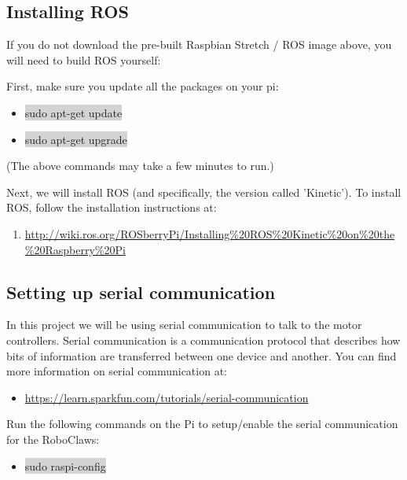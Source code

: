 \documentclass{article}
\begin{document}
\subsection{Installing ROS}
If you do not download the pre-built Raspbian Stretch / ROS image above, you will need to build ROS yourself:

First, make sure you update all the packages on your pi:
\begin{itemize}
	\item[] \colorbox{lightgray}{sudo apt-get update}
	\item[] \colorbox{lightgray}{sudo apt-get upgrade}
\end{itemize} 
(The above commands may take a few minutes to run.)

Next, we will install ROS (and specifically, the version called 'Kinetic').  To install ROS, follow the installation instructions at:
\begin{enumerate}
	\item[] \href{http://wiki.ros.org/ROSberryPi/Installing%20ROS%20Kinetic%20on%20the%20Raspberry%20Pi}{http://wiki.ros.org/ROSberryPi/Installing\%20ROS\%20Kinetic\%20on\%20the\%20Raspberry\%20Pi}
\end{enumerate}

\subsection{Setting up serial communication}	

In this project we will be using serial communication to talk to the motor controllers. Serial communication is a communication protocol that describes how bits of information are transferred between one device and another. You can find more information on serial communication at:
\begin{itemize}
	\item \href{https://learn.sparkfun.com/tutorials/serial-communication}{https://learn.sparkfun.com/tutorials/serial-communication}
\end{itemize}

\noindent Run the following commands on the Pi to setup/enable the serial communication for the RoboClaws:
\begin{itemize}
	\item[] \colorbox{lightgray}{sudo raspi-config}
\end{itemize}
\end{document}
